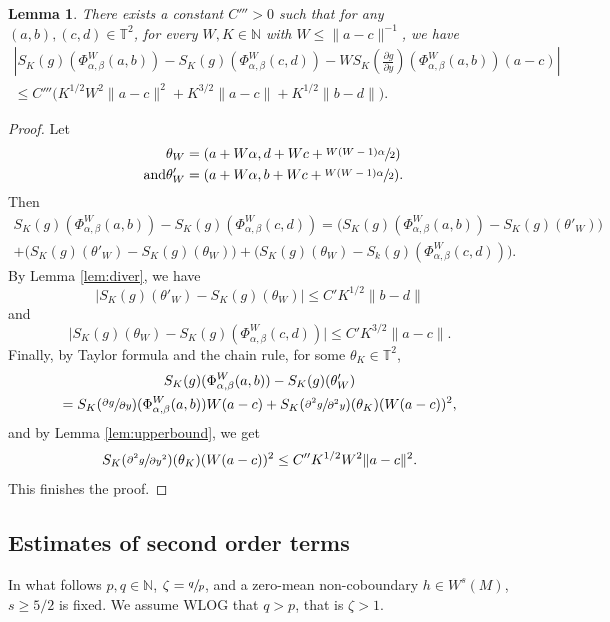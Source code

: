 \documentclass[10pt]{amsart}
\theoremstyle{definition}
\theoremstyle{plain}
\newtheorem{lemma}[definition]{Lemma}
\newcommand\NN{\mathbb{N}}
\newcommand\TT{\mathbb{T}}
\begin{document}
\begin{lemma}\label{lem:span}
There exists a constant $C'''>0$ such that for any $(a,b),(c,d)\in \TT^2$, for every $W,K\in \NN$ with $W\leq \|a-c\|^{-1}$, we have
\begin{multline*}
|S_K(g)(\Phi_{\alpha,\beta}^W(a,b))-S_K(g)(\Phi_{\alpha,\beta}^{W}(c,d))-WS_K(\frac{\partial g}{\partial y})(\Phi_{\alpha,\beta}^W(a,b))(a-c)| \\
\leq C'''\bigl(K^{1/2}W^2\|a-c\|^2 + K^{3/2}\|a-c\|+K^{1/2}\|b-d\|\bigr).
\end{multline*}
\end{lemma}
\begin{proof}Let
\begin{align*}
\theta_W&=(a+W\alpha, d+Wc+\sfrac{W(W-1)\alpha}{2})\\
\tag*{and}
\theta'_{W}&=(a+W\alpha,b+Wc+\sfrac{W(W-1)\alpha}{2}).
\end{align*}
Then
\begin{multline*}
S_K(g)(\Phi_{\alpha,\beta}^W(a,b))-S_K(g)(\Phi_{\alpha,\beta}^{W}(c,d))=
\bigl(S_K(g)(\Phi_{\alpha,\beta}^W(a,b))-S_K(g)(\theta'_W)\bigr)\\
+\bigl(S_K(g)(\theta'_W)-S_K(g)(\theta_W)\bigr)+
\bigl(S_K(g)(\theta_W)-S_k(g)(\Phi_{\alpha,\beta}^W(c,d))\bigr).
\end{multline*}
By Lemma \ref{lem:diver}, we have
\[
\bigl|S_K(g)(\theta'_W)-S_K(g)(\theta_W)\bigr|\leq C'K^{1/2}\|b-d\|
\]
and
\[
\bigl|S_K(g)(\theta_W)-S_K(g)(\Phi_{\alpha,\beta}^W(c,d))\bigr|\leq C'K^{3/2}\|a-c\|.
\]
Finally, by Taylor formula and the chain rule, for some $\theta_K\in \TT^2$,
\begin{multline*}
S_K(g)(\Phi_{\alpha,\beta}^W(a,b))-S_K(g)(\theta'_W) \\=S_K(\sfrac{\partial g}{\partial y})(\Phi_{\alpha,\beta}^W(a,b))W(a-c)+S_K(\sfrac{\partial^2 g}{\partial^2 y})(\theta_K)(W(a-c))^2,
\end{multline*}
and by Lemma \ref{lem:upperbound}, we get
\[
S_K(\sfrac{\partial^2 g}{\partial y^2})(\theta_K)(W(a-c))^2\leq C''
K^{1/2}W^2\|a-c\|^2.
\]
This finishes the proof.
\end{proof}

\subsection{Estimates of second order terms}

In what follows $p,q\in \NN$, $\zeta=\sfrac{q}{p}$, and a zero-mean non-coboundary $h\in W^s(M)$, $s\geq 5/2$ is fixed. We assume WLOG that $q>p$, that is $\zeta>1$.
\end{document}
